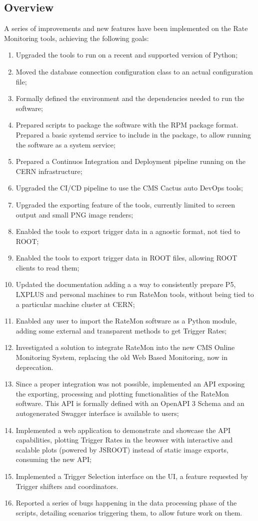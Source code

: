 \subsection{Overview}

A series of improvements and new features have been implemented on the Rate Monitoring tools, achieving the following goals:

\begin{enumerate}

\item Upgraded the tools to run on a recent and supported version of Python;
\item Moved the database connection configuration class to an actual configuration file;
\item Formally defined the environment and the dependencies needed to run the software;
\item Prepared scripts to package the software with the RPM package format. Prepared a basic systemd service to include in the package, to allow running the software as a system service;
\item Prepared a Continuos Integration and Deployment pipeline running on the CERN infrastructure;
\item Upgraded the CI/CD pipeline to use the CMS Cactus auto DevOps tools;
\item Upgraded the exporting feature of the tools, currently limited to screen output and small PNG image renders;
\item Enabled the tools to export trigger data in a agnostic format, not tied to ROOT;
\item Enabled the tools to export trigger data in ROOT files, allowing ROOT clients to read them;
\item Updated the documentation adding a a way to consistently prepare P5, LXPLUS and personal machines to run RateMon tools, without being tied to a particular machine cluster at CERN;
\item Enabled any user to import the RateMon software as a Python module, adding some external and transparent methods to get Trigger Rates;
\item Investigated a solution to integrate RateMon into the new CMS Online Monitoring System, replacing the old Web Based Monitoring, now in deprecation.
\item Since a proper integration was not possible, implemented an API exposing the exporting, processing and plotting functionalities of the RateMon software. This API is formally defined with an OpenAPI 3 Schema and an autogenerated Swagger interface is available to users;
\item Implemented a web application to demonstrate and showcase the API capabilities, plotting Trigger Rates in the browser with interactive and scalable plots (powered by JSROOT) instead of static image exports, consuming the new API;
\item Implemented a Trigger Selection interface on the UI, a feature requested by Trigger shifters and coordinators.
\item Reported a series of bugs happening in the data processing phase of the scripts, detailing scenarios triggering them, to allow future work on them.


\end{enumerate}
